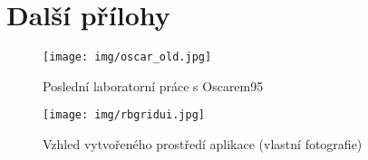 \documentclass[12pt,a4paper]{article}
\begin{document}
	
\pagestyle{plain}
\setcounter{page}{3}
\tableofcontents





	







\newpage
	\printbibliography[title={Seznam literatury, pramenů a internetových zdrojů}]
	
	\newpage %
	
	
	\listoffigures   %
	
        \pagestyle{empty}
	\newpage
 
   
   
 
	
\section*{Další přílohy}
\enlargethispage{20mm}
        \begin{figure}
		\begin{center}
			\texttt{[image: img/oscar\_old.jpg]}
			\caption{Poslední laboratorní práce s Oscarem95 \cite{Laborka-2009}}
			\label{fig:oscar_old}
		\end{center}
		\vspace{-2mm}
	\end{figure}
\newpage
 \begin{wrapfigure}{c}{\textwidth}
		\begin{center}
			\texttt{[image: img/rbgridui.jpg]}
			\caption{Vzhled vytvořeného prostředí aplikace (vlastní fotografie)}
			\label{fig:rbgridui}
		\end{center}
		\vspace{0mm}

\end{wrapfigure}
	
\end{document}
